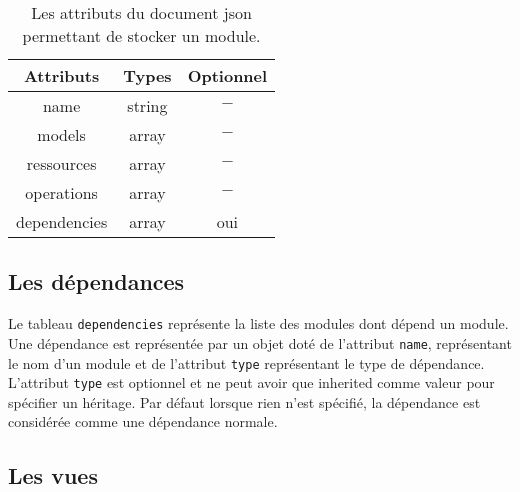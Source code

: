 \documentclass[a4paper,11pt]{report}
\begin{document}
\begin{table}[ht]
 \begin{tabular}{|c|c|c|}
  \hline
     Attributs &Types & Optionnel\\
   \hline
    name &  string &  $-$\\
     \hline
    models & array & $-$\\
     \hline
    ressources & array & $-$ \\
     \hline
    operations & array &  $-$\\
     \hline
    dependencies & array & oui \\
     \hline    
\end{tabular}
\caption{Les attributs du document json permettant de stocker un module. \label{si:mod} }
\end{table}

\subsection{Les dépendances}

Le tableau {\tt dependencies} représente la liste des modules dont dépend un module.
Une dépendance est représentée par un objet doté de l'attribut {\tt name}, représentant  le nom d'un module et de l'attribut
 {\tt type} représentant le type de dépendance. L'attribut {\tt type} est optionnel et ne peut avoir  que  \og inherited \fg comme 
 valeur pour spécifier un héritage. Par défaut lorsque rien n'est spécifié, la dépendance est considérée comme une dépendance normale. 

\subsection{Les vues  \label{vues}}
\end{document}
